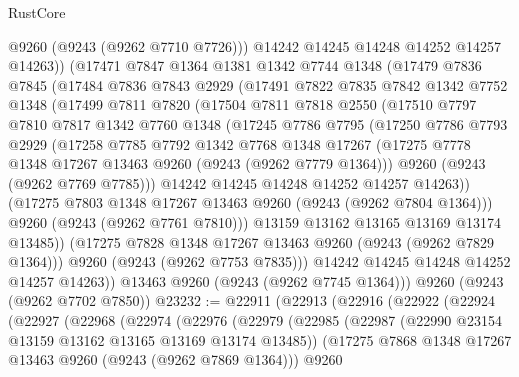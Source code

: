 \begin{lexlean}{RustCore}
\begin{coremodule}
          @9260
          (@9243 (@9262 @7710 @7726)))
        @14242
        @14245
        @14248
        @14252
        @14257
        @14263))
    (@17471
      @7847
      @1364
      @1381
      @1342
      @7744
      @1348
      (@17479
        @7836
        @7845
        (@17484
          @7836
          @7843
          @2929
          (@17491
            @7822
            @7835
            @7842
            @1342
            @7752
            @1348
            (@17499
              @7811
              @7820
              (@17504
                @7811
                @7818
                @2550
                (@17510
                  @7797
                  @7810
                  @7817
                  @1342
                  @7760
                  @1348
                  (@17245
                    @7786
                    @7795
                    (@17250
                      @7786
                      @7793
                      @2929
                      (@17258
                        @7785
                        @7792
                        @1342
                        @7768
                        @1348
                        @17267
                        (@17275 @7778 @1348 @17267 @13463 @9260 (@9243 (@9262 @7779 @1364)))
                        @9260
                        (@9243 (@9262 @7769 @7785)))
                      @14242
                      @14245
                      @14248
                      @14252
                      @14257
                      @14263))
                  (@17275 @7803 @1348 @17267 @13463 @9260 (@9243 (@9262 @7804 @1364)))
                  @9260
                  (@9243 (@9262 @7761 @7810)))
                @13159
                @13162
                @13165
                @13169
                @13174
                @13485))
            (@17275 @7828 @1348 @17267 @13463 @9260 (@9243 (@9262 @7829 @1364)))
            @9260
            (@9243 (@9262 @7753 @7835)))
          @14242
          @14245
          @14248
          @14252
          @14257
          @14263))
      @13463
      @9260
      (@9243 (@9262 @7745 @1364)))
    @9260
    (@9243 (@9262 @7702 @7850))
@23232 := @22911
    (@22913
      (@22916
        (@22922
          (@22924
            (@22927
              (@22968
                (@22974
                  (@22976
                    (@22979
                      (@22985
                        (@22987 (@22990 @23154 @13159 @13162 @13165 @13169 @13174 @13485))
                        (@17275 @7868 @1348 @17267 @13463 @9260 (@9243 (@9262 @7869 @1364)))
                        @9260

\end{coremodule}
\end{lexlean}
